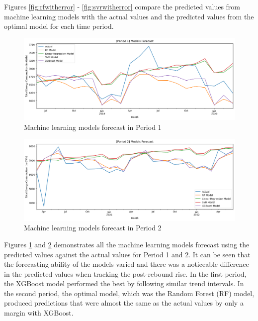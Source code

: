 \documentclass[runningheads]{llncs}
\begin{document}
Figures \ref{fig:rfwitherror} - \ref{fig:svrwitherror} compare the predicted values from machine learning models with the actual values and the predicted values from the optimal model for each time period.

\begin{figure}[h]
    \centering
    \includegraphics[width=\textwidth]{results/forecastp1.png}
    \caption{Machine learning models forecast in Period 1}
    \label{fig:forecast-p1}
\end{figure}
\begin{figure}[h]
    \centering
    \includegraphics[width=\textwidth]{figures/results/forecastp2.png}
    \caption{Machine learning models forecast in Period 2}
    \label{fig:forecast-p2}
\end{figure}

Figures \ref{fig:forecast-p1} and \ref{fig:forecast-p2} demonstrates all the machine learning models forecast using the predicted values against the actual values for Period 1 and 2. It can be seen that the forecasting ability of the models varied and there was a noticeable difference in the predicted values when tracking the post-rebound rise. In the first period, the XGBoost model performed the best by following similar trend intervals. In the second period, the optimal model, which was the Random Forest (RF) model, produced predictions that were almost the same as the actual values by only a margin with XGBoost.
\end{document}
